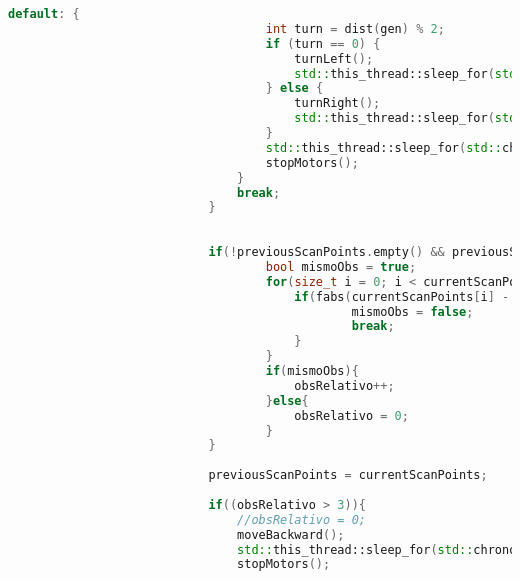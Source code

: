 \begin{lstlisting}[language={C++}, caption={Quinto ajuste de c\'odigo}, label={QuintoAjuste}]
                                default: {
                                    int turn = dist(gen) % 2;
                                    if (turn == 0) {
                                        turnLeft();
                                        std::this_thread::sleep_for(std::chrono::seconds(5));
                                    } else {
                                        turnRight();
                                        std::this_thread::sleep_for(std::chrono::seconds(5));
                                    }
                                    std::this_thread::sleep_for(std::chrono::seconds(2));
                                    stopMotors();
                                }
                                break;
                            }
        
                            
                            if(!previousScanPoints.empty() && previousScanPoints.size() == currentScanPoints.size()){
                                    bool mismoObs = true;
                                    for(size_t i = 0; i < currentScanPoints.size(); ++i){
                                        if(fabs(currentScanPoints[i] - previousScanPoints[i]) > 0.05){
                                                mismoObs = false;
                                                break;
                                        }
                                    }
                                    if(mismoObs){
                                        obsRelativo++;
                                    }else{
                                        obsRelativo = 0;
                                    }
                            }
                            
                            previousScanPoints = currentScanPoints;
                            
                            if((obsRelativo > 3)){
                                //obsRelativo = 0;
                                moveBackward();
                                std::this_thread::sleep_for(std::chrono::seconds(3));
                                stopMotors();
                                

\end{lstlisting}
